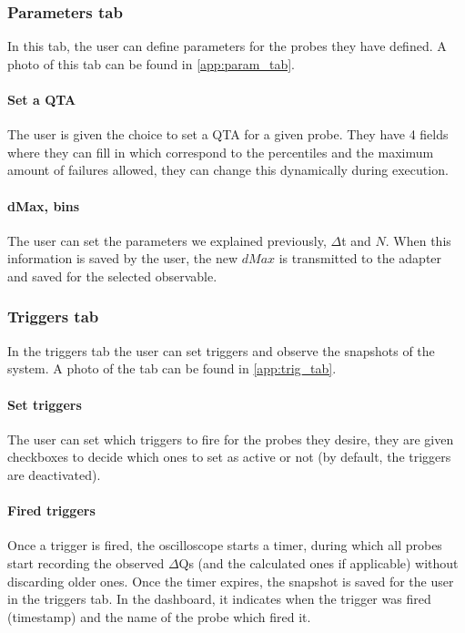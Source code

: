     \subsubsection{Parameters tab}
        In this tab, the user can define parameters for the probes they have defined. A photo of this tab can be found in \cref{app:param_tab}.

    \paragraph{Set a QTA}
        The user is given the choice to set a QTA for a given probe. They have 4 fields where they can fill in which correspond to the percentiles and the maximum amount of failures allowed, they can change this dynamically during execution.

    \paragraph{dMax, bins}
        The user can set the parameters we explained previously, $\Delta$t and $N$. When this information is saved by the user, the new $dMax$ is transmitted to the adapter and saved for the selected observable.

    \subsubsection{Triggers tab}
        In the triggers tab the user can set triggers and observe the snapshots of the system. A photo of the tab can be found in \cref{app:trig_tab}.

    \paragraph{Set triggers}
        The user can set which triggers to fire for the probes they desire, they are given checkboxes to decide which ones to set as active or not (by default, the triggers are deactivated).
    
    \paragraph{Fired triggers}
        Once a trigger is fired, the oscilloscope starts a timer, during which all probes start recording the observed $\Delta$Qs (and the calculated ones if applicable) without discarding older ones. Once the timer expires, the snapshot is saved for the user in the triggers tab. In the dashboard, it indicates when the trigger was fired (timestamp) and the name of the probe which fired it.
    
